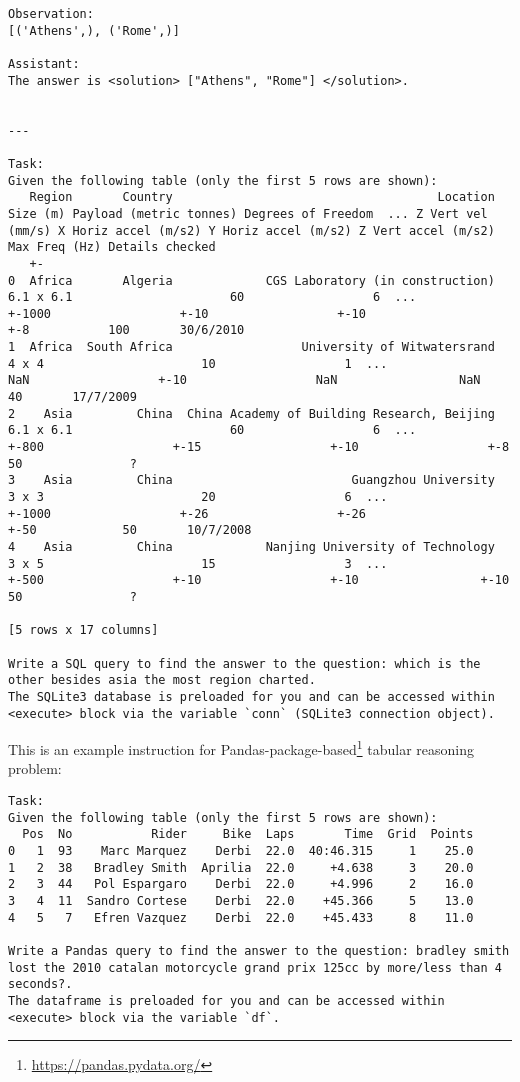 \begin{lstlisting}[breaklines]
Observation:
[('Athens',), ('Rome',)]

Assistant:
The answer is <solution> ["Athens", "Rome"] </solution>.


---

Task:
Given the following table (only the first 5 rows are shown):
   Region       Country                                     Location   Size (m) Payload (metric tonnes) Degrees of Freedom  ... Z Vert vel (mm/s) X Horiz accel (m/s2) Y Horiz accel (m/s2) Z Vert accel (m/s2) Max Freq (Hz) Details checked
   +-
0  Africa       Algeria             CGS Laboratory (in construction)  6.1 x 6.1                      60                  6  ...             +-1000                  +-10                  +-10                  +-8           100       30/6/2010
1  Africa  South Africa                  University of Witwatersrand      4 x 4                      10                  1  ...               NaN                  +-10                  NaN                 NaN            40       17/7/2009
2    Asia         China  China Academy of Building Research, Beijing  6.1 x 6.1                      60                  6  ...              +-800                  +-15                  +-10                  +-8            50               ?
3    Asia         China                         Guangzhou University      3 x 3                      20                  6  ...             +-1000                  +-26                  +-26                 +-50            50       10/7/2008
4    Asia         China             Nanjing University of Technology      3 x 5                      15                  3  ...              +-500                  +-10                  +-10                 +-10            50               ?

[5 rows x 17 columns]

Write a SQL query to find the answer to the question: which is the other besides asia the most region charted.
The SQLite3 database is preloaded for you and can be accessed within <execute> block via the variable `conn` (SQLite3 connection object).
\end{lstlisting}

This is an example instruction for Pandas-package-based\footnote{\url{https://pandas.pydata.org/}} tabular reasoning problem:

\begin{lstlisting}[breaklines]
Task:
Given the following table (only the first 5 rows are shown):
  Pos  No           Rider     Bike  Laps       Time  Grid  Points
0   1  93    Marc Marquez    Derbi  22.0  40:46.315     1    25.0
1   2  38   Bradley Smith  Aprilia  22.0     +4.638     3    20.0
2   3  44   Pol Espargaro    Derbi  22.0     +4.996     2    16.0
3   4  11  Sandro Cortese    Derbi  22.0    +45.366     5    13.0
4   5   7   Efren Vazquez    Derbi  22.0    +45.433     8    11.0

Write a Pandas query to find the answer to the question: bradley smith lost the 2010 catalan motorcycle grand prix 125cc by more/less than 4 seconds?.
The dataframe is preloaded for you and can be accessed within <execute> block via the variable `df`.    
\end{lstlisting}

